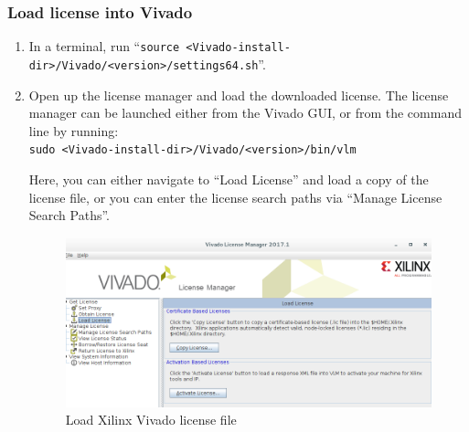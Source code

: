 \subsubsection{Load license into Vivado}
\begin{enumerate}
\item In a terminal, run ``\verb+source <Vivado-install-dir>/Vivado/<version>/settings64.sh+''.
\item Open up the license manager and load the downloaded license. The license manager can be launched either from the Vivado GUI, or from the command line by running: \\\verb+sudo <Vivado-install-dir>/Vivado/<version>/bin/vlm+\newline

Here, you can either navigate to ``Load License'' and load a copy of the license file, or you can enter the license search paths via ``Manage License Search Paths''.

\begin{figure}[H]
	\centerline{\includegraphics[scale=0.5]{./figures/xilinx_vivado_license_load}}
	\caption{Load Xilinx Vivado license file}
\end{figure}
\end{enumerate}

